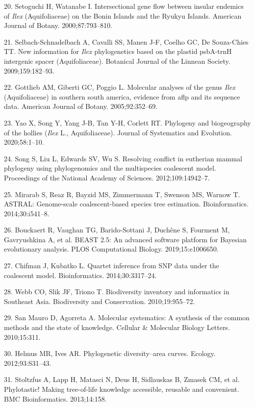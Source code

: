 \documentclass[]{article}
\begin{document}
\leavevmode\hypertarget{ref-setoguchi2000intersectional}{}%
20. Setoguchi H, Watanabe I. Intersectional gene flow between insular endemics of \emph{Ilex} (Aquifoliaceae) on the Bonin Islands and the Ryukyu Islands. American Journal of Botany. 2000;87:793--810.

\leavevmode\hypertarget{ref-selbach2009new}{}%
21. Selbach-Schnadelbach A, Cavalli SS, Manen J-F, Coelho GC, De Souza-Chies TT. New information for \emph{Ilex} phylogenetics based on the plastid psbA-trnH intergenic spacer (Aquifoliaceae). Botanical Journal of the Linnean Society. 2009;159:182--93.

\leavevmode\hypertarget{ref-gottlieb2005molecular}{}%
22. Gottlieb AM, Giberti GC, Poggio L. Molecular analyses of the genus \emph{Ilex} (Aquifoliaceae) in southern south america, evidence from aflp and its sequence data. American Journal of Botany. 2005;92:352--69.

\leavevmode\hypertarget{ref-yao2020phylogeny}{}%
23. Yao X, Song Y, Yang J-B, Tan Y-H, Corlett RT. Phylogeny and biogeography of the hollies (\emph{Ilex} L., Aquifoliaceae). Journal of Systematics and Evolution. 2020;58:1--10.

\leavevmode\hypertarget{ref-song2012resolving}{}%
24. Song S, Liu L, Edwards SV, Wu S. Resolving conflict in eutherian mammal phylogeny using phylogenomics and the multispecies coalescent model. Proceedings of the National Academy of Sciences. 2012;109:14942--7.

\leavevmode\hypertarget{ref-mirarab2014astral}{}%
25. Mirarab S, Reaz R, Bayzid MS, Zimmermann T, Swenson MS, Warnow T. ASTRAL: Genome-scale coalescent-based species tree estimation. Bioinformatics. 2014;30:i541--8.

\leavevmode\hypertarget{ref-bouckaert2019beast}{}%
26. Bouckaert R, Vaughan TG, Barido-Sottani J, Duchêne S, Fourment M, Gavryushkina A, et al. BEAST 2.5: An advanced software platform for Bayesian evolutionary analysis. PLOS Computational Biology. 2019;15:e1006650.

\leavevmode\hypertarget{ref-chifman2014quartet}{}%
27. Chifman J, Kubatko L. Quartet inference from SNP data under the coalescent model. Bioinformatics. 2014;30:3317--24.

\leavevmode\hypertarget{ref-webb2010biodiversity}{}%
28. Webb CO, Slik JF, Triono T. Biodiversity inventory and informatics in Southeast Asia. Biodiversity and Conservation. 2010;19:955--72.

\leavevmode\hypertarget{ref-san2010molecular}{}%
29. San Mauro D, Agorreta A. Molecular systematics: A synthesis of the common methods and the state of knowledge. Cellular \& Molecular Biology Letters. 2010;15:311.

\leavevmode\hypertarget{ref-helmus2012phylogenetic}{}%
30. Helmus MR, Ives AR. Phylogenetic diversity--area curves. Ecology. 2012;93:S31--43.

\leavevmode\hypertarget{ref-stoltzfus2013phylotastic}{}%
31. Stoltzfus A, Lapp H, Matasci N, Deus H, Sidlauskas B, Zmasek CM, et al. Phylotastic! Making tree-of-life knowledge accessible, reusable and convenient. BMC Bioinformatics. 2013;14:158.
\end{document}

